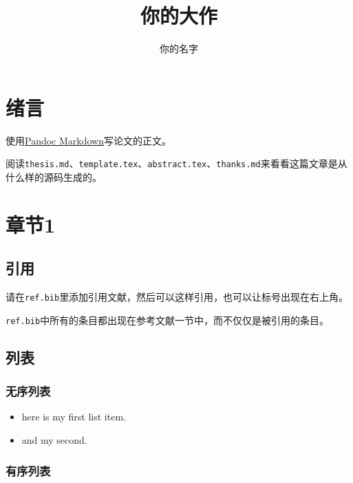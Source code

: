 \documentclass[titlepage,openany]{SHUugt}
\begin{document}
\title{你的大作}
\author{你的名字}



\makecover

\chapter{绪言}\label{ux7eeaux8a00}

使用\href{http://johnmacfarlane.net/pandoc/README.html}{Pandoc
Markdown}写论文的正文。

阅读\texttt{thesis.md}、\texttt{template.tex}、\texttt{abstract.tex}、\texttt{thanks.md}来看看这篇文章是从什么样的源码生成的。

\chapter{章节1}\label{ux7ae0ux82821}

\section{引用}\label{ux5f15ux7528}

请在\texttt{ref.bib}里添加引用文献，然后可以这样引用\cite{aumann1976agreeing}，也可以让标号出现在右上角。

\texttt{ref.bib}中所有的条目都出现在参考文献一节中，而不仅仅是被引用的条目。

\section{列表}\label{ux5217ux8868}

\subsection{无序列表}\label{ux65e0ux5e8fux5217ux8868}

\begin{itemize}
\tightlist
\item
  here is my first list item.
\item
  and my second.
\end{itemize}

\subsection{有序列表}\label{ux6709ux5e8fux5217ux8868}
\end{document}
